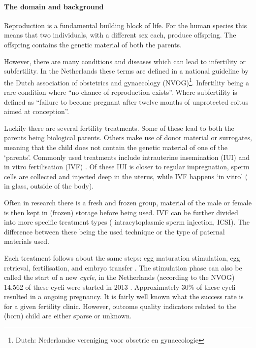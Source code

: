 \paragraph{The domain and background}
Reproduction is a fundamental building block of life.
For the human species this means that two individuals, with a different sex each, produce offspring.
The offspring contains the genetic material of both the parents.

However, there are many conditions and diseases which can lead to infertility or subfertility.
In the Netherlands these terms are defined in a national guideline by the Dutch association of obstetrics and gynaecology (NVOG)\footnote{Dutch: Nederlandse vereniging voor obsetrie en gynaecologie}\cite{subfertilityGuideline}.
Infertility being a rare condition where ``no chance of reproduction exists''.
Where subfertility is defined as ``failure to become pregnant after twelve months of unprotected coitus aimed at conception''.

Luckily there are several fertility treatments.
Some of these lead to both the parents being biological parents. 
Others make use of donor material or surrogates, meaning that the child does not contain the genetic material of one of the `parents'.
Commonly used treatments include intrauterine insemination (IUI) and in vitro fertilisation (IVF) \cite{treatmentExplanation}.
Of these IUI is closer to regular impregnation, sperm cells are collected and injected deep in the uterus, while IVF happens `in vitro' (\ie{} in glass, outside of the body).

Often in research there is a fresh and frozen group, material of the male or female is then kept in (frozen) storage before being used.
IVF can be further divided into more specific treatment types (\eg{} intracytoplasmic sperm injection, ICSI).
The difference between these being the used technique or the type of paternal materials used.

Each treatment follows about the same steps: egg maturation stimulation, egg retrieval, fertilisation, and embryo transfer \cite{treatmentExplanation}.
The stimulation phase can also be called the start of a new \emph{cycle}, in the Netherlands (according to the NVOG) 14,562 of these cycli were started in 2013 \cite{ivfReportNVOG2013}.
Approximately 30\% of these cycli resulted in a ongoing pregnancy.
It is fairly well known what the success rate is for a given fertility clinic.
However, outcome quality indicators related to the (born) child are either sparse or unknown.

